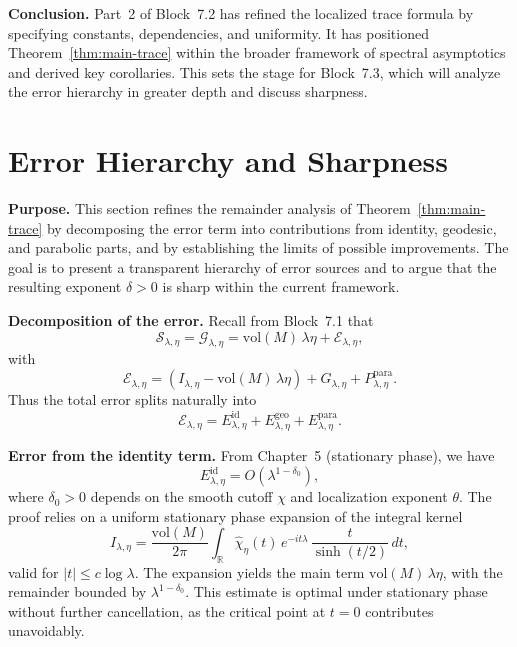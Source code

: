 \medskip

\noindent\textbf{Conclusion.}
Part~2 of Block~7.2 has refined the localized trace formula by specifying constants, dependencies, and uniformity.  
It has positioned Theorem~\ref{thm:main-trace} within the broader framework of spectral asymptotics and derived key corollaries.  
This sets the stage for Block~7.3, which will analyze the error hierarchy in greater depth and discuss sharpness.



\section{Error Hierarchy and Sharpness}

\noindent\textbf{Purpose.}
This section refines the remainder analysis of Theorem~\ref{thm:main-trace} by decomposing the error term into contributions from identity, geodesic, and parabolic parts, and by establishing the limits of possible improvements.  
The goal is to present a transparent hierarchy of error sources and to argue that the resulting exponent $\delta>0$ is sharp within the current framework.

\medskip

\noindent\textbf{Decomposition of the error.}
Recall from Block~7.1 that
\[
  \mathcal{S}_{\lambda,\eta} = \mathcal{G}_{\lambda,\eta}
  = \mathrm{vol}(M)\,\lambda\eta + \mathcal{E}_{\lambda,\eta},
\]
with
\[
  \mathcal{E}_{\lambda,\eta}
  = (I_{\lambda,\eta} - \mathrm{vol}(M)\,\lambda\eta)
    + G_{\lambda,\eta}
    + P_{\lambda,\eta}^{\mathrm{para}}.
\]
Thus the total error splits naturally into
\[
  \mathcal{E}_{\lambda,\eta} = E^{\mathrm{id}}_{\lambda,\eta}
  + E^{\mathrm{geo}}_{\lambda,\eta}
  + E^{\mathrm{para}}_{\lambda,\eta}.
\]

\medskip

\noindent\textbf{Error from the identity term.}
From Chapter~5 (stationary phase), we have
\[
  E^{\mathrm{id}}_{\lambda,\eta} = O(\lambda^{1-\delta_0}),
\]
where $\delta_0>0$ depends on the smooth cutoff $\chi$ and localization exponent $\theta$.  
The proof relies on a uniform stationary phase expansion of the integral kernel
\[
  I_{\lambda,\eta}
  = \frac{\mathrm{vol}(M)}{2\pi} \int_{\mathbb{R}}
    \widehat{\chi}_\eta(t)\, e^{-it\lambda}\,\frac{t}{\sinh(t/2)}\, dt,
\]
valid for $|t|\leq c\log\lambda$.  
The expansion yields the main term $\mathrm{vol}(M)\,\lambda\eta$, with the remainder bounded by $\lambda^{1-\delta_0}$.  
This estimate is optimal under stationary phase without further cancellation, as the critical point at $t=0$ contributes unavoidably.

